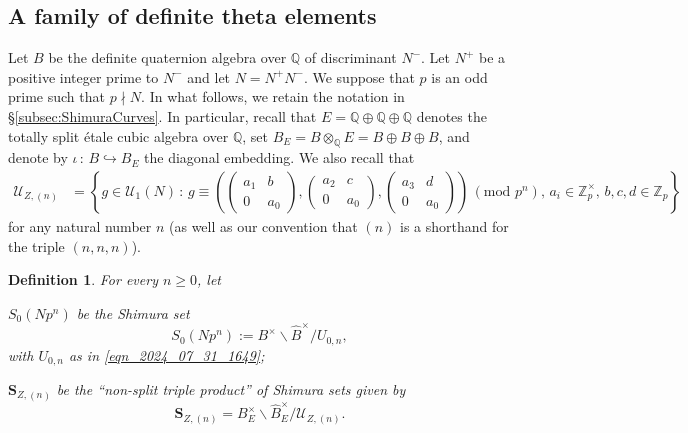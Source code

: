 \documentclass{amsart}
\numberwithin{equation}{section}
\newtheorem{defn}[theorem]{Definition}
\newcommand{\QQ}{\mathbb{Q}}
\newcommand{\Zp}{\mathbb{Z}_p}
\begin{document}
\subsection{A family of definite theta elements}\label{subsec:familyofthetaelements}
Let $B$ be the definite quaternion algebra over $\QQ$ of discriminant $N^-$. Let $N^+$ be a positive integer prime to $N^-$ and let $N =N^+N^-$. We suppose that $p$ is an odd prime such that $p \nmid N$. In what follows, we retain the notation in \S \ref{subsec:ShimuraCurves}. In particular, recall that $E = \QQ \oplus \QQ \oplus \QQ$ denotes the totally split \'etale cubic algebra over $\QQ$, set $B_E  = B \otimes_\QQ E = B \oplus B \oplus B$, and denote by $\iota\,:\,B \hookrightarrow B_E$ the diagonal embedding.  We also recall that 
\begin{align*}
\mathcal{U}_{Z,(n)} &=\left \{ g \in \mathcal{U}_1(N)\,:\, g \equiv \left(\left( \begin{smallmatrix}  a_1 & b \\ 0 & a_0 \end{smallmatrix}\right),\left( \begin{smallmatrix}  a_2 & c \\ 0 & a_0 \end{smallmatrix}\right),\left( \begin{smallmatrix} a_3 & d \\ 0 & a_0 \end{smallmatrix}\right)\right)\, (\text{mod }p^n),\,a_i \in\Zp^\times, \, b,c,d \in\Zp\right\} 
\end{align*}
for any natural number $n$ (as well as our convention that $(n)$ is a shorthand for the triple $(n,n,n)$).
\begin{defn}\label{def:shimura-set}
    For every $n \geq 0$, let   
        \item[i)] $S_0(Np^n)$ be the Shimura set 
        \[S_0(Np^n) := B^\times \backslash \widehat{B}^\times / U_{0,n}, \]
        with  $U_{0,n}$ as in \eqref{eqn_2024_07_31_1649};
        \item[ii)] $\mathbf{S}_{Z,(n)}$ be the ``non-split triple product'' of Shimura sets given by 
        \[ \mathbf{S}_{Z,(n)}= B_E^\times \backslash \widehat{B}_E^\times / \mathcal{U}_{Z,(n)}. \]
\end{defn}
\end{document}
